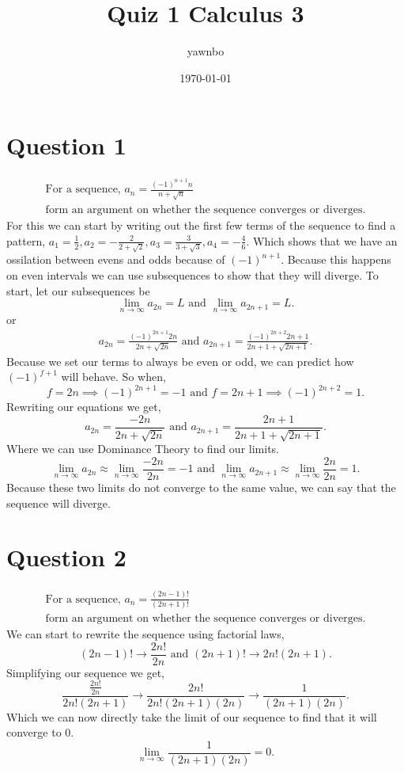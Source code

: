 \documentclass[a4paper]{article}
\title{Quiz 1 Calculus 3}
\author{yawnbo}
\date{\today}
\begin{document}
\maketitle
\section*{Question 1 }%
\label{sec:Question 1 }
\begin{gather*}
\text{ For a sequence, }a_n = \frac{ \left( -1 \right) ^{ n+1 }n }{ n+\sqrt{ n} } \\ 
\text{ form an argument on whether the sequence converges or diverges. }
\end{gather*}
For this we can start by writing out the first few terms of the sequence to find a pattern, $ a_1 = \frac{1}{2}, a_2 = -\frac{2}{2+\sqrt{ 2}}, a_3 = \frac{3}{3+\sqrt{ 3}}, a_4 = -\frac{4}{6}  $. Which shows that we have an ossilation between evens and odds because of $ \left( -1 \right) ^{ n+1 } $. Because this happens on even intervals we can use subsequences to show that they will diverge. 
To start, let our subsequences be
\[
\lim_{ n \to \infty} a_{ 2n } = L \text{ and } \lim_{ n \to \infty} a_{ 2n+1 }=L
.\] 
or
\begin{align*}
	a_{ 2n }=\frac{ \left( -1 \right) ^{ 2n+1 }2n }{ 2n+\sqrt{ 2n} } \text{ and } a_{ 2n+1 }=\frac{ \left( -1 \right) ^{ 2n+2 }2n+1 }{ 2n+1+\sqrt{ 2n+1} }
.\end{align*}
Because we set our terms to always be even or odd, we can predict how $ \left( -1 \right) ^{ f+1 } $ will behave. So when,
\[
f=2n \implies \left( -1 \right) ^{ 2n+1 }=-1 \text{ and } f=2n+1 \implies \left( -1 \right) ^{ 2n+2 }=1
.\]
Rewriting our equations we get,
\[
a_{ 2n }=\frac{ -2n }{ 2n+\sqrt{ 2n} } \text{ and } a_{ 2n+1 }=\frac{ 2n+1 }{ 2n+1+\sqrt{ 2n+1} }
.\] 
Where we can use Dominance Theory to find our limits.
\[
\lim_{ n \to \infty} a_{ 2n }\approx \lim_{ n \to \infty} \frac{ -2n }{ 2n }=-1 \text{ and } \lim_{ n \to \infty} a_{ 2n+1 }\approx \lim_{ n \to \infty} \frac{ 2n }{ 2n }=1
.\] 
Because these two limits do not converge to the same value, we can say that the sequence will diverge.

\newpage
\section*{Question 2}%
\label{sec:Question 2}

\begin{gather*}
\text{ For a sequence, }a_n = \frac{ \left( 2n-1 \right) ! }{ \left( 2n+1 \right) ! }\\ 
\text{ form an argument on whether the sequence converges or diverges. }
\end{gather*}
We can start to rewrite the sequence using factorial laws,
\[
	\left( 2n-1 \right) ! \to \frac{ 2n! }{ 2n } \text{ and } \left( 2n+1 \right) ! \to 2n!\left( 2n+1 \right) 
.\] 
Simplifying our sequence we get,
\[
\frac{ \frac{ 2n! }{ 2n } }{ 2n!\left( 2n+1 \right)  }\to \frac{ 2n! }{ 2n!\left( 2n+1 \right) \left( 2n \right)  }\to \frac{1}{\left( 2n+1 \right) \left( 2n \right) }
.\] 
Which we can now directly take the limit of our sequence to find that it will converge to 0.
\[
\lim_{ n \to \infty} \frac{1}{\left( 2n+1 \right) \left( 2n \right) }= 0
.\] 

\end{document}
